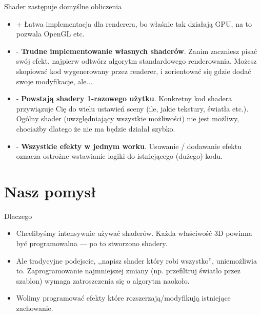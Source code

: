 \documentclass{beamer}
\begin{document}
\begin{frame}{Shader zastępuje domyślne obliczenia}

\begin{itemize}
  \item + Łatwa implementacja dla renderera, bo właśnie tak działają GPU,
    na to pozwala OpenGL etc.
  \item - \textbf{Trudne implementowanie własnych shaderów}.
    Zanim zaczniesz pisać swój efekt, najpierw odtwórz algorytm
    standardowego renderowania.
    Możesz skopiować kod wygenerowany przez renderer,
    i zorientować się gdzie dodać swoje modyfikacje, ale...
  \item - \textbf{Powstają shadery 1-razowego użytku}.
    Konkretny kod shadera przywiązuje Cię do wielu ustawień sceny
    (ile, jakie tekstury, światła etc.).
    Ogólny shader (uwzględniający wszystkie możliwości) nie jest możliwy,
    chociażby dlatego że nie ma będzie działał szybko.
  \item - \textbf{Wszystkie efekty w jednym worku}.
    Usuwanie / dodawanie efektu oznacza ostrożne wstawianie logiki
    do istniejącego (dużego) kodu.
\end{itemize}
\end{frame}

\section{Nasz pomysł}

\begin{frame}{Dlaczego}
\begin{itemize}
  \item Chcelibyśmy intensywnie używać shaderów. Każda właściwość 3D powinna
    być programowalna --- po to stworzono shadery.

  \item Ale tradycyjne podejscie, ,,napisz shader który robi wszystko'',
    uniemożliwia to. Zaprogramowanie najmniejszej zmiany (np. przefiltruj
    światło przez szablon) wymaga zatroszczenia się o algorytm naokoło.

  \item Wolimy programować efekty które rozszerzają/modyfikują
    istniejące zachowanie.
\end{itemize}
\end{frame}
\end{document}
